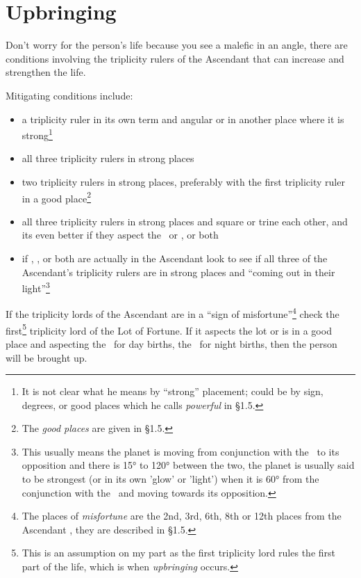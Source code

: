 \section{Upbringing}
\label{sec:upbringing}
Don't worry for the person's life because you see a malefic in an angle, there are conditions involving the triplicity rulers of the Ascendant that can increase and strengthen the life. 

Mitigating conditions include:
\begin{itemize}[topsep=0pt,itemsep=0pt]

\item a triplicity ruler in its own term and angular or in another place where it is strong\footnote{It is not clear what he means by ``strong'' placement; could be by sign, degrees, or good places which he calls \textsl{powerful} in \S1.5.}

\item all three triplicity rulers in strong places

\item two triplicity rulers in strong places, preferably with the first triplicity ruler in a good place\footnote{The \textsl{good places} are given in \S1.5.}

\item all three triplicity rulers in strong places and square or trine each other, and its even better if they aspect the \Sun\, or \Moon, or both 

\item if \Saturn, \Mars, or both are actually in the Ascendant look to see if all three of the Ascendant's triplicity rulers are in strong places and ``coming out in their light''\footnote{This usually means the planet is moving from conjunction with the \Sun\ to its opposition and there is 15° to 120° between the two, the planet is usually said to be strongest (or in its own 'glow' or 'light') when it is 60° from the conjunction with the \Sun\ and moving towards its opposition.}
\end{itemize}

If the triplicity lords of the Ascendant are in a ``sign of misfortune''\footnote{The places of \textsl{misfortune} are the 2nd, 3rd, 6th, 8th or 12th places from the Ascendant , they are described in \S1.5.} check the first\footnote{This is an assumption on my part as the first triplicity lord rules the first part of the life, which is when \textsl{upbringing} occurs.} triplicity lord of the Lot of Fortune. If it aspects the lot or is in a good place and aspecting the \Sun\, for day births, the \Moon\, for night births, then the person will be brought up.


